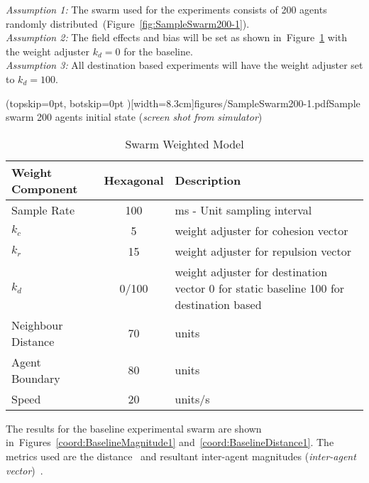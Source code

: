 \documentclass{ieeeaccess}
\begin{document}
\noindent\textit{Assumption 1:} The swarm used for the experiments consists of 200 agents randomly distributed~(Figure~\ref{fig:SampleSwarm200-1}).\\ 
\textit{Assumption 2:} The field effects and bias will be set as shown in~Figure~\ref{tab:DynamicPhysics1} with the weight adjuster $k_d = 0$ for the baseline.\\
\textit{Assumption 3:} All destination based experiments will have the weight adjuster set to $k_d = 100$.


\Figure[t!](topskip=0pt, botskip=0pt )[width=8.3cm]{figures/SampleSwarm200-1.pdf}{Sample swarm 200 agents initial state (\textit{screen shot from simulator})\label{fig:SampleSwarm200-1}}

\begin{table}
\begin{center}
\begin{tabular}{| p{1.5cm} | c | p{3.5cm} |}
\hline
\bf Weight \bf Component & \bf Hexagonal & \bf Description \\ \hline
Sample Rate & 100 & ms - Unit sampling interval\\  \hline
$k_c$ & 5 & weight adjuster for cohesion vector\\  \hline
$k_r$ & 15 & weight adjuster for repulsion  vector\\  \hline
$k_d$ & 0/100 & weight adjuster for destination vector 0 for static baseline 100 for destination based\\  \hline
Neighbour Distance & 70 & units\\  \hline
Agent Boundary & 80 & units\\  \hline
Speed & 20 & units/s\\  \hline
\end{tabular}\caption{Swarm Weighted Model} \label{tab:DynamicPhysics1}
\end{center}
\end{table}

The results for the baseline experimental swarm are shown in~Figures~\ref{coord:BaselineMagnitude1} and~\ref{coord:BaselineDistance1}. The metrics used are the distance~\cite{NIM:09} and resultant inter-agent magnitudes (\textit{inter-agent vector})~\cite{EKB:18}.
\end{document}
